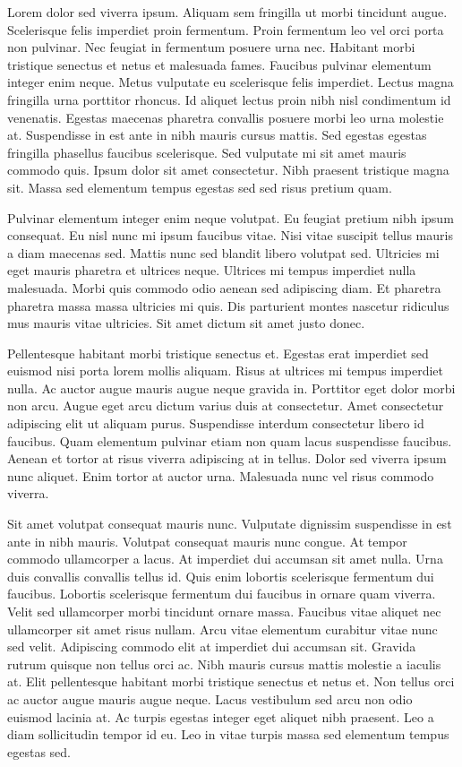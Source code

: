 \documentclass[11pt,a4paper]{article}
\begin{document}
Lorem dolor sed viverra ipsum. Aliquam sem fringilla ut morbi tincidunt augue. Scelerisque felis imperdiet proin fermentum. Proin fermentum leo vel orci porta non pulvinar. Nec feugiat in fermentum posuere urna nec. Habitant morbi tristique senectus et netus et malesuada fames. Faucibus pulvinar elementum integer enim neque. Metus vulputate eu scelerisque felis imperdiet. Lectus magna fringilla urna porttitor rhoncus. Id aliquet lectus proin nibh nisl condimentum id venenatis. Egestas maecenas pharetra convallis posuere morbi leo urna molestie at. Suspendisse in est ante in nibh mauris cursus mattis. Sed egestas egestas fringilla phasellus faucibus scelerisque. Sed vulputate mi sit amet mauris commodo quis. Ipsum dolor sit amet consectetur. Nibh praesent tristique magna sit. Massa sed elementum tempus egestas sed sed risus pretium quam.

Pulvinar elementum integer enim neque volutpat. Eu feugiat pretium nibh ipsum consequat. Eu nisl nunc mi ipsum faucibus vitae. Nisi vitae suscipit tellus mauris a diam maecenas sed. Mattis nunc sed blandit libero volutpat sed. Ultricies mi eget mauris pharetra et ultrices neque. Ultrices mi tempus imperdiet nulla malesuada. Morbi quis commodo odio aenean sed adipiscing diam. Et pharetra pharetra massa massa ultricies mi quis. Dis parturient montes nascetur ridiculus mus mauris vitae ultricies. Sit amet dictum sit amet justo donec.

Pellentesque habitant morbi tristique senectus et. Egestas erat imperdiet sed euismod nisi porta lorem mollis aliquam. Risus at ultrices mi tempus imperdiet nulla. Ac auctor augue mauris augue neque gravida in. Porttitor eget dolor morbi non arcu. Augue eget arcu dictum varius duis at consectetur. Amet consectetur adipiscing elit ut aliquam purus. Suspendisse interdum consectetur libero id faucibus. Quam elementum pulvinar etiam non quam lacus suspendisse faucibus. Aenean et tortor at risus viverra adipiscing at in tellus. Dolor sed viverra ipsum nunc aliquet. Enim tortor at auctor urna. Malesuada nunc vel risus commodo viverra.

Sit amet volutpat consequat mauris nunc. Vulputate dignissim suspendisse in est ante in nibh mauris. Volutpat consequat mauris nunc congue. At tempor commodo ullamcorper a lacus. At imperdiet dui accumsan sit amet nulla. Urna duis convallis convallis tellus id. Quis enim lobortis scelerisque fermentum dui faucibus. Lobortis scelerisque fermentum dui faucibus in ornare quam viverra. Velit sed ullamcorper morbi tincidunt ornare massa. Faucibus vitae aliquet nec ullamcorper sit amet risus nullam. Arcu vitae elementum curabitur vitae nunc sed velit. Adipiscing commodo elit at imperdiet dui accumsan sit. Gravida rutrum quisque non tellus orci ac. Nibh mauris cursus mattis molestie a iaculis at. Elit pellentesque habitant morbi tristique senectus et netus et. Non tellus orci ac auctor augue mauris augue neque. Lacus vestibulum sed arcu non odio euismod lacinia at. Ac turpis egestas integer eget aliquet nibh praesent. Leo a diam sollicitudin tempor id eu. Leo in vitae turpis massa sed elementum tempus egestas sed.
\end{document}
